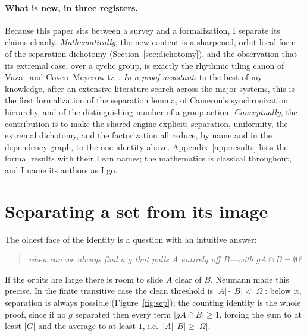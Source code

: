 \documentclass[11pt]{article}
\begin{document}
\paragraph{What is new, in three registers.} Because this paper sits between a
survey and a formalization, I separate its claims cleanly. \emph{Mathematically},
the new content is a sharpened, orbit-local form of the separation dichotomy
(Section~\ref{sec:dichotomy}), and the observation that its extremal case, over a
cyclic group, is exactly the rhythmic tiling canon of Vuza~\cite{Vuza1991} and
Coven--Meyerowitz~\cite{CovenMeyerowitz1999}.
\emph{In a proof assistant}: to the best of my knowledge, after an extensive
literature search across the major systems, this is the first formalization of the
separation lemma, of Cameron's synchronization hierarchy, and of the
distinguishing number of a group action. \emph{Conceptually}, the contribution is to make the shared engine
explicit: separation, uniformity, the extremal dichotomy, and the factorization
all reduce, by name and in the dependency graph, to the one identity above.
Appendix~\ref{app:results} lists the formal results with their Lean names; the
mathematics is classical throughout, and I name its authors as I go.



\section{Separating a set from its image}
\label{sec:setting}

The oldest face of the identity is a question with an intuitive answer:
\begin{quote}\itshape
  when can we always find a $g$ that pulls $A$ entirely off $B$---with
  $gA\cap B=\emptyset$?
\end{quote}
If the orbits are large there is room to slide $A$ clear of $B$. Neumann made
this precise. In the finite transitive case the clean threshold is
$|A|\cdot|B|<|\Omega|$: below it, separation is always possible
(Figure~\ref{fig:sep}); the counting identity is the whole proof, since if no $g$
separated then every term $|gA\cap B|\ge1$, forcing the sum to at least $|G|$ and
the average to at least $1$, i.e.\ $|A|\,|B|\ge|\Omega|$.
\end{document}
